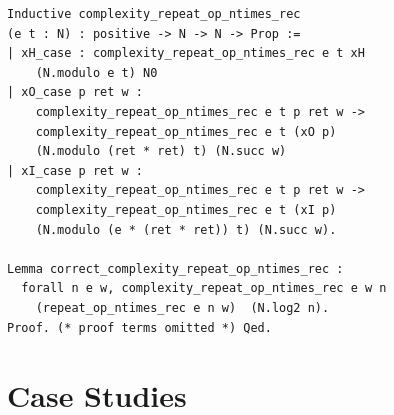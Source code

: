\documentclass[sigconf, anonymous]{acmart}
\begin{document}
\begin{lstlisting}[frame=single, language=Coq, caption={Extractor Complexity},
  label={extractor_complex},captionpos=t, basicstyle=\ttfamily\footnotesize,
  abovecaptionskip=-\medskipamount]
Inductive complexity_repeat_op_ntimes_rec 
(e t : N) : positive -> N -> N -> Prop :=
| xH_case : complexity_repeat_op_ntimes_rec e t xH 
    (N.modulo e t) N0
| xO_case p ret w : 
    complexity_repeat_op_ntimes_rec e t p ret w ->
    complexity_repeat_op_ntimes_rec e t (xO p) 
    (N.modulo (ret * ret) t) (N.succ w)
| xI_case p ret w : 
    complexity_repeat_op_ntimes_rec e t p ret w ->
    complexity_repeat_op_ntimes_rec e t (xI p) 
    (N.modulo (e * (ret * ret)) t) (N.succ w).

Lemma correct_complexity_repeat_op_ntimes_rec : 
  forall n e w, complexity_repeat_op_ntimes_rec e w n 
    (repeat_op_ntimes_rec e n w)  (N.log2 n).
Proof. (* proof terms omitted *) Qed.
\end{lstlisting}

\section{Case Studies}\label{case_studies}
\end{document}
